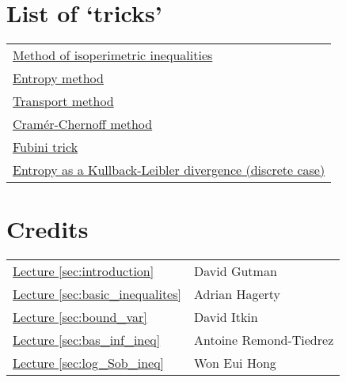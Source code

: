 \documentclass{amsproc}
\newcommand{\fref}[2]{\hyperref[#2]{#1 \ref*{#2}}}
\begin{document}
\section*{List of `tricks'}
	\begin{tabular}{l}
		\hyperref[sec:method_of_isoperimetric_inequalities]{Method of isoperimetric inequalities}\\
		\hyperref[sec:entropy_method]{Entropy method}\\
		\hyperref[sec:transport_method]{Transport method}\\
		\hyperref[rmk:cramer_chernoff]{Cram\'{e}r-Chernoff method}\\
		\hyperref[rmk:Fubini]{Fubini trick}\\
		\hyperref[rmk:entropy_as_KL_divergence]{Entropy as a Kullback-Leibler divergence (discrete case)}
	\end{tabular}
\section*{Credits}
	\begin{tabular}{ll}
		\fref{Lecture}{sec:introduction}& David Gutman\\
		\fref{Lecture}{sec:basic_inequalites}& Adrian Hagerty\\
		\fref{Lecture}{sec:bound_var}& David Itkin\\
		\fref{Lecture}{sec:bas_inf_ineq}& Antoine Remond-Tiedrez\\
		\fref{Lecture}{sec:log_Sob_ineq}& Won Eui Hong
	\end{tabular}



\end{document}
